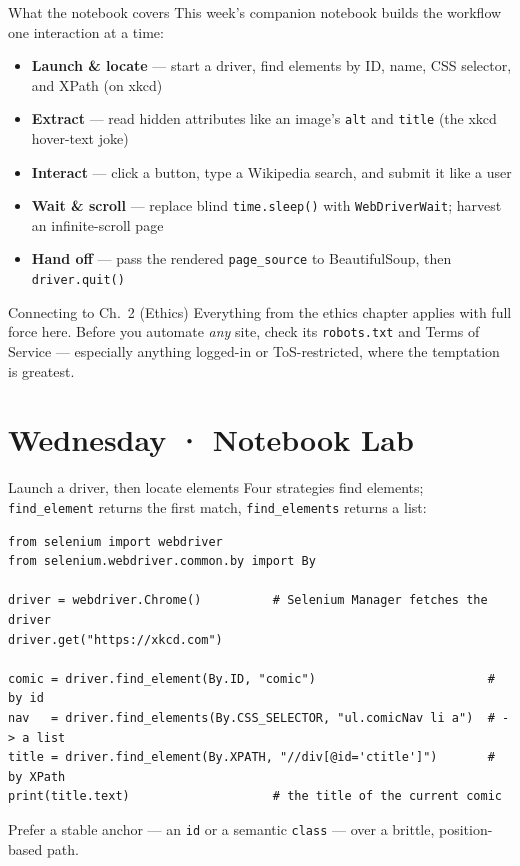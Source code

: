 \documentclass[9pt,aspectratio=169]{beamer}
\begin{document}
\begin{frame}{What the notebook covers}
    This week's companion notebook builds the workflow one interaction at a time:
    \begin{itemize}
        \item \textbf{Launch \& locate} --- start a driver, find elements by ID, name, CSS selector, and XPath (on xkcd)
        \item \textbf{Extract} --- read hidden attributes like an image's \texttt{alt} and \texttt{title} (the xkcd hover-text joke)
        \item \textbf{Interact} --- click a button, type a Wikipedia search, and submit it like a user
        \item \textbf{Wait \& scroll} --- replace blind \texttt{time.sleep()} with \texttt{WebDriverWait}; harvest an infinite-scroll page
        \item \textbf{Hand off} --- pass the rendered \texttt{page\_source} to BeautifulSoup, then \texttt{driver.quit()}
    \end{itemize}

    \vspace{0.75em}

    \begin{alertblock}{Connecting to Ch.~2 (Ethics)}
        Everything from the ethics chapter applies with full force here. Before you automate \textit{any} site, check its \texttt{robots.txt} and Terms of Service --- especially anything logged-in or ToS-restricted, where the temptation is greatest.
    \end{alertblock}
\end{frame}

\section{Wednesday · Notebook Lab}

\begin{frame}[fragile]{Launch a driver, then locate elements}
    Four strategies find elements; \texttt{find\_element} returns the first match, \texttt{find\_elements} returns a list:
\begin{lstlisting}
from selenium import webdriver
from selenium.webdriver.common.by import By

driver = webdriver.Chrome()          # Selenium Manager fetches the driver
driver.get("https://xkcd.com")

comic = driver.find_element(By.ID, "comic")                        # by id
nav   = driver.find_elements(By.CSS_SELECTOR, "ul.comicNav li a")  # -> a list
title = driver.find_element(By.XPATH, "//div[@id='ctitle']")       # by XPath
print(title.text)                    # the title of the current comic
\end{lstlisting}
    Prefer a stable anchor --- an \texttt{id} or a semantic \texttt{class} --- over a brittle, position-based path.
\end{frame}
\end{document}
